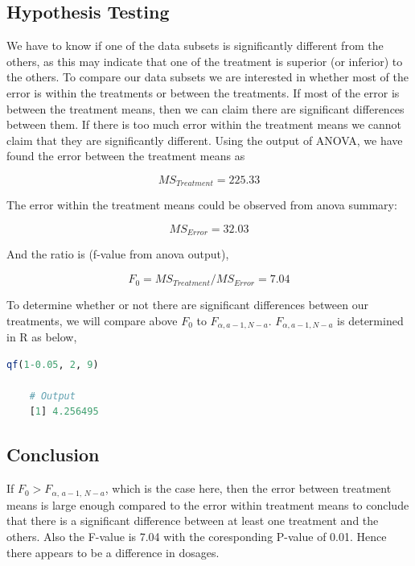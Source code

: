 \documentclass[11pt]{article}
\begin{document}


\subsection{Hypothesis Testing}
We have to know if one of the data subsets is significantly different from the others, as this may indicate that one of the treatment is superior (or inferior) to the others. To compare our data subsets we are interested in whether most of the error is within the treatments or between the treatments. If most of the error is between the treatment means, then we can claim there are significant differences between them. If there is too much error within the treatment means we cannot claim that they are significantly different. Using the output of ANOVA, we have found the error between the treatment means as 

$$\displaystyle MS_{Treatment} = 225.33$$

The error within the treatment means could be observed from anova summary: 

$$\displaystyle MS_{Error} = 32.03$$

And the ratio is (f-value from anova output),

$$\displaystyle F_0 = MS_{Treatment}/MS_{Error} = 7.04$$

To determine whether or not there are significant differences between our treatments, we will compare above $\displaystyle F_0$ to $\displaystyle F_{\alpha, a-1, N-a}$. $\displaystyle F_{\alpha, a-1, N-a}$ is determined in R as below,

\begin{lstlisting}[language=R]
    qf(1-0.05, 2, 9)   

    # Output
    [1] 4.256495
\end{lstlisting}

\subsection{Conclusion}
If $\displaystyle F_{0}>F_{\alpha ,\,a-1,\,N-a}$, which is the case here, then the error between treatment means is large enough compared to the error within treatment means to conclude that there is a significant difference between at least one treatment and the others. Also the F-value is 7.04 with the coresponding P-value of 0.01. Hence there appears to be a difference in dosages.
\end{document}
